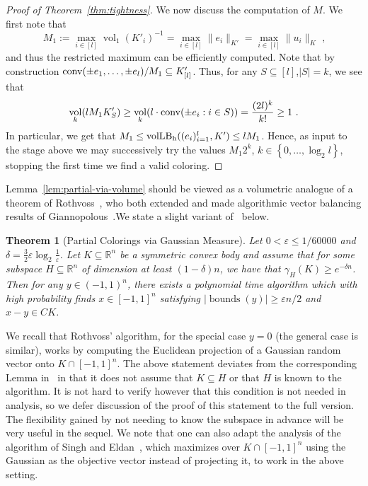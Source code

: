 \documentclass[12pt]{article}
\newtheorem{theorem}{Theorem}
\newcommand{\R}{{\mathbb{R}}}
\newcommand\eps{\varepsilon}
\newcommand{\set}[1]{\left\{ #1 \right\}}
\DeclareMathOperator{\vollb}{volLB}
\DeclareMathOperator{\vol}{vol}
\DeclareMathOperator{\bnds}{bounds}
\newcommand{\notename}[2]{{\textcolor{red}{{\bf (#1:} {#2}{\bf ) }}}}
\newcommand{\notename}[2]{{\textcolor{red}{\footnotesize{\bf (#1:} {#2}{\bf ) }}}}
\newcommand{\dnote}[1]{{\notename{Daniel}{#1}}}
\newcommand{\notename}[2]{{}}
\newcommand{\dnote}[1]{}
\begin{document}
\begin{proof}[Proof of Theorem~\ref{thm:tightness}]
We now discuss the computation of $M$. We first note that 
\[
M_1 := \max_{i \in [l]} \vol_1(K'_i)^{-1} = \max_{i \in [l]} \|e_i\|_{K'} =
\max_{i \in [l]} \|u_i\|_K \text{ ,}
\]
and thus the restricted maximum can be efficiently computed. Note that by
construction ${\rm conv}(\pm e_1,\dots, \pm e_l)/M_1 \subseteq K'_{[l]}$. Thus,
for any $S \subseteq [l]$,$|S|=k$, we see that
\[
\vol_k(l M_1 K'_S) \geq \vol_{k}(l \cdot {\rm conv}(\pm e_i: i \in S)) = \frac{(2l)^k}{k!}
 \geq 1 \text{ .}
\]
In particular, we get that $M_1 \leq \vollb_{\rm h}((e_i)_{i=1}^l,K') \leq l M_1$.
Hence, as input to the stage above we may successively try the values $M_1
2^k$, $k \in \set{0,\dots,\log_2 l}$, stopping the first time we find a valid
coloring. 
\end{proof}

Lemma~\ref{lem:partial-via-volume} should be viewed as a volumetric analogue of
a theorem of Rothvoss~\cite{rothvoss-giann}, who both extended and made
algorithmic vector balancing results of Giannopolous~\cite{giannop}.We state a
slight variant of~\cite[Lemma 9]{rothvoss-giann} below.

\begin{theorem}[Partial Colorings via Gaussian Measure]\label{thm:roth-giann}
Let $0 < \eps \leq 1/60000$ and $\delta = \frac{3}{2}\eps \log_2
\frac{1}{\eps}$. Let $K \subseteq \R^n$ be a symmetric convex body and assume
that for some subspace $H \subseteq \R^n$ of dimension at least $(1-\delta)n$,
we have that $\gamma_H(K) \geq e^{-\delta n}$. Then for any $y \in (-1,1)^n$,
there exists a polynomial time algorithm which with high probability finds $x
\in [-1,1]^n$ satisfying $|\bnds(y)| \geq \eps n/2$ and
$x-y \in CK$.
\end{theorem}

We recall that Rothvoss' algorithm, for the special case $y = 0$ (the general
case is similar), works by computing the Euclidean projection of a Gaussian
random vector onto $K \cap [-1,1]^n$. The above statement deviates from the
corresponding Lemma in~\cite{rothvoss-giann} in that it does not assume that $K
\subseteq H$ or that $H$ is known to the algorithm. It is not hard to verify
however that this condition is not needed in analysis, so we defer discussion of
the proof of this statement to the full version. The flexibility gained by not
needing to know the subspace in advance will be very useful in the sequel. We
note that one can also adapt the analysis of the algorithm of Singh and
Eldan~\cite{ES14}, which maximizes over $K \cap [-1,1]^n$ using the Gaussian as
the objective vector instead of projecting it, to work in the above setting.   
\end{document}
